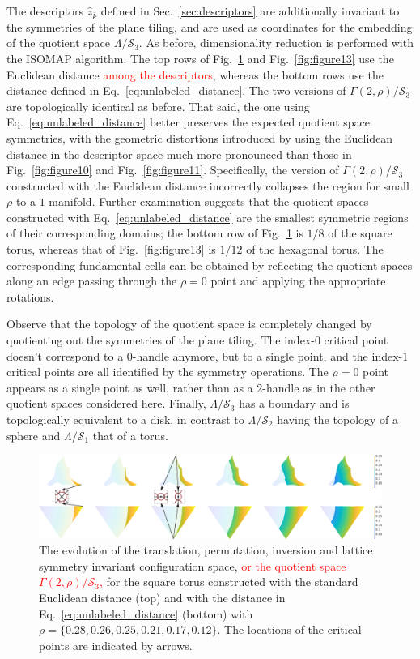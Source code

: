 \documentclass[default,iicol]{sn-jnl}%
\theoremstyle{thmstyleone}%
\theoremstyle{thmstyletwo}%
\theoremstyle{thmstylethree}%
\renewcommand{\vec}[1]{\bar{#1}}
\providecommand{\red}[1]{\textcolor{red}{#1}}
\begin{document}
The descriptors $\hat{z}_{\vec{k}}$ defined in Sec.\ \ref{sec:descriptors} are additionally invariant to the symmetries of the plane tiling, and are used as coordinates for the embedding of the quotient space $\Lambda / \mathcal{S}_3$. As before, dimensionality reduction is performed with the ISOMAP algorithm. The top rows of Fig.\ \ref{fig:figure12} and Fig.\ \ref{fig:figure13} use the Euclidean distance \red{among the descriptors}, whereas the bottom rows use the distance defined in Eq.\ \ref{eq:unlabeled_distance}. The two versions of $\Gamma(2, \rho) / \mathcal{S}_3$ are topologically identical as before. That said, the one using Eq.\ \ref{eq:unlabeled_distance} better preserves the expected quotient space symmetries, with the geometric distortions introduced by using the Euclidean distance in the descriptor space much more pronounced than those in Fig.\ \ref{fig:figure10} and Fig.\ \ref{fig:figure11}. Specifically, the version of $\Gamma(2, \rho) / \mathcal{S}_3$ constructed with the Euclidean distance incorrectly collapses the region for small $\rho$ to a $1$-manifold. Further examination suggests that the quotient spaces constructed with Eq.\ \ref{eq:unlabeled_distance} are the smallest symmetric regions of their corresponding domains; the bottom row of Fig.\ \ref{fig:figure12} is $1 / 8$ of the square torus, whereas that of Fig.\ \ref{fig:figure13} is $1 / 12$ of the hexagonal torus. The corresponding fundamental cells can be obtained by reflecting the quotient spaces along an edge passing through the $\rho = 0$ point and applying the appropriate rotations.

Observe that the topology of the quotient space is completely changed by quotienting out the symmetries of the plane tiling. The index-$0$ critical point doesn't correspond to a $0$-handle anymore, but to a single point, and the index-$1$ critical points are all identified by the symmetry operations. The $\rho = 0$ point appears as a single point as well, rather than as a $2$-handle as in the other quotient spaces considered here. Finally, $\Lambda / \mathcal{S}_3$ has a boundary and is topologically equivalent to a disk, in contrast to $\Lambda / \mathcal{S}_2$ having the topology of a sphere and $\Lambda / \mathcal{S}_1$ that of a torus.

\begin{figure}
	\centering
	\includegraphics[width=1.0\textwidth]{figure12.eps}
	\caption{The evolution of the translation, permutation, inversion and lattice symmetry invariant configuration space, \red{or the quotient space $\Gamma(2, \rho) / \mathcal{S}_3$,} for the square torus constructed with the standard Euclidean distance (top) and with the distance in Eq.\ \ref{eq:unlabeled_distance} (bottom) with $\rho=\{0.28, 0.26, 0.25, 0.21, 0.17, 0.12\}$. The locations of the critical points are indicated by arrows.}
	\label{fig:figure12}
\end{figure}
\end{document}
